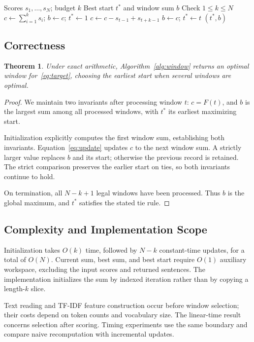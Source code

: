 \documentclass[10pt,journal,compsoc]{IEEEtran}
\newtheorem{theorem}{Theorem}
\begin{document}
\begin{algorithm}[t]
\caption{Maximum-score fixed-sentence window}\label{alg:window}
\begin{algorithmic}[1]
\Require Scores $s_1,\ldots,s_N$; budget $k$
\Ensure Best start $t^*$ and window sum $b$
\State Check $1\le k\le N$
\State $c\gets\sum_{i=1}^{k}s_i$; $b\gets c$; $t^*\gets1$
 \State $c\gets c-s_{t-1}+s_{t+k-1}$
  \State $b\gets c$; $t^*\gets t$
 \EndIf
\EndFor
\State \Return $(t^*,b)$
\end{algorithmic}
\end{algorithm}

\subsection{Correctness}
\begin{theorem}
Under exact arithmetic, Algorithm~\ref{alg:window} returns an optimal window for~\eqref{eq:target}, choosing the earliest start when several windows are optimal.
\end{theorem}
\begin{proof}
We maintain two invariants after processing window $t$: $c=F(t)$, and $b$ is the largest sum among all processed windows, with $t^*$ its earliest maximizing start.

Initialization explicitly computes the first window sum, establishing both invariants. Equation~\eqref{eq:update} updates $c$ to the next window sum. A strictly larger value replaces $b$ and its start; otherwise the previous record is retained. The strict comparison preserves the earlier start on ties, so both invariants continue to hold.

On termination, all $N-k+1$ legal windows have been processed. Thus $b$ is the global maximum, and $t^*$ satisfies the stated tie rule.
\end{proof}

\subsection{Complexity and Implementation Scope}
Initialization takes $O(k)$ time, followed by $N-k$ constant-time updates, for a total of $O(N)$. Current sum, best sum, and best start require $O(1)$ auxiliary workspace, excluding the input scores and returned sentences. The implementation initializes the sum by indexed iteration rather than by copying a length-$k$ slice.

Text reading and TF-IDF feature construction occur before window selection; their costs depend on token counts and vocabulary size. The linear-time result concerns selection after scoring. Timing experiments use the same boundary and compare naive recomputation with incremental updates.
\end{document}
